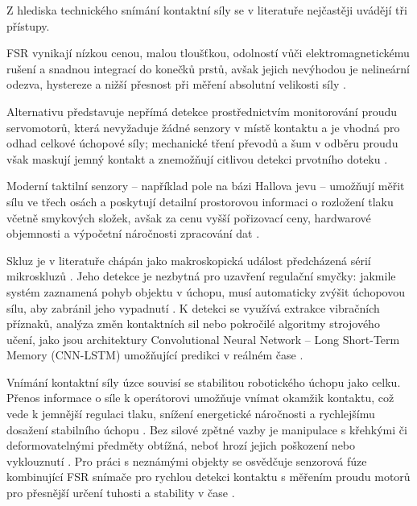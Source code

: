 \documentclass[FZS,DP]{tulthesis}
\begin{document}
Z hlediska technického snímání kontaktní síly se v literatuře nejčastěji uvádějí tři přístupy. 

FSR vynikají nízkou cenou, malou tloušťkou, odolností vůči elektromagnetickému rušení a snadnou integrací do konečků prstů, avšak jejich nevýhodou je nelineární odezva, hystereze a nižší přesnost při měření absolutní velikosti síly \cite{Sadun2016711, Lebosse2011}. 

Alternativu představuje nepřímá detekce prostřednictvím monitorování proudu servomotorů, která nevyžaduje žádné senzory v místě kontaktu a je vhodná pro odhad celkové úchopové síly; mechanické tření převodů a šum v odběru proudu však maskují jemný kontakt a znemožňují citlivou detekci prvotního doteku \cite{Mohammadi2024418, Ninu2014}. 

Moderní taktilní senzory -- například pole na bázi Hallova jevu -- umožňují měřit sílu ve třech osách a poskytují detailní prostorovou informaci o rozložení tlaku včetně smykových složek, avšak za cenu vyšší pořizovací ceny, hardwarové objemnosti a výpočetní náročnosti zpracování dat \cite{GIUDICI2025, Begalinova2020, Xu2025}.

Skluz je v literatuře chápán jako makroskopická událost předcházená sérií mikroskluzů \cite{Begalinova2020}. Jeho detekce je nezbytná pro uzavření regulační smyčky: jakmile systém zaznamená pohyb objektu v úchopu, musí automaticky zvýšit úchopovou sílu, aby zabránil jeho vypadnutí \cite{Begalinova2020, Xu2025}. K detekci se využívá extrakce vibračních příznaků, analýza změn kontaktních sil nebo pokročilé algoritmy strojového učení, jako jsou architektury Convolutional Neural Network – Long Short-Term Memory (CNN-LSTM) umožňující predikci v reálném čase \cite{Xu2025, GIUDICI2025}.

Vnímání kontaktní síly úzce souvisí se stabilitou robotického úchopu jako celku. Přenos informace o síle k operátorovi umožňuje vnímat okamžik kontaktu, což vede k jemnější regulaci tlaku, snížení energetické náročnosti a rychlejšímu dosažení stabilního úchopu \cite{Papakonstantinou20251218, Thomas2023110}. Bez silové zpětné vazby je manipulace s křehkými či deformovatelnými předměty obtížná, neboť hrozí jejich poškození nebo vyklouznutí \cite{Park2022, DAbbraccio201923, GIUDICI2025}. Pro práci s neznámými objekty se osvědčuje senzorová fúze kombinující FSR snímače pro rychlou detekci kontaktu s měřením proudu motorů pro přesnější určení tuhosti a stability v čase \cite{Mohammadi2024418}.
\end{document}
